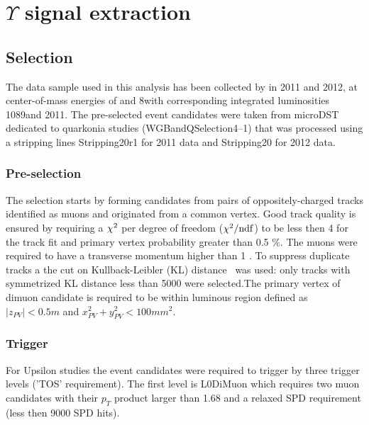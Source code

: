 \section{\texorpdfstring{$\Upsilon$}{Y} signal extraction}
\label{sec:upsilon}

\subsection{Selection}
\label{sec:ups:selelection}
The data sample used in this analysis has been collected by \lhcb in 2011 and
2012, at center-of-mass energies of \tev and 8\tev with corresponding
integrated luminosities 1089\invpb and 2011\invpb.
The pre-selected event candidates were taken from microDST dedicated to
quarkonia studies (WGBandQSelection4--1) that was processed using a 
stripping lines Stripping20r1 for 2011 data and Stripping20 for 2012 data.

\subsubsection{Pre-selection}
\label{sec:upsilon:selelection:preselection}

The selection starts by forming candidates from pairs of oppositely-charged
tracks identified as muons and originated from a common vertex.
Good track quality is ensured by requiring a $\chi^2$ per degree of
freedom ($\chi^2/\rm{ndf}$) to be less then 4 for the track fit and primary
vertex probability greater than 0.5 \%.
The muons were required to have a transverse momentum higher than 1 \gev.
To suppress duplicate tracks a the cut on Kullback-Leibler (KL)
distance~\cite{Needham:1082460} was used: only tracks with symmetrized KL distance less
than 5000 were selected.The primary vertex of dimuon candidate is required to be within luminous region
defined as $|z_{PV}| < 0.5 m$ and $x_{PV}^2 + y_{PV}^2 < 100 mm^2$.
\subsubsection{Trigger}
\label{sec:upsilon:selection:trigger}

For Upsilon studies the event candidates  were required to trigger by three
trigger levels ('TOS' requirement). The first level is L0DiMuon which  requires
two muon candidates with their $p_T$ product larger than 1.68 \gevcc and
a relaxed SPD requirement (less then 9000 SPD hits).

